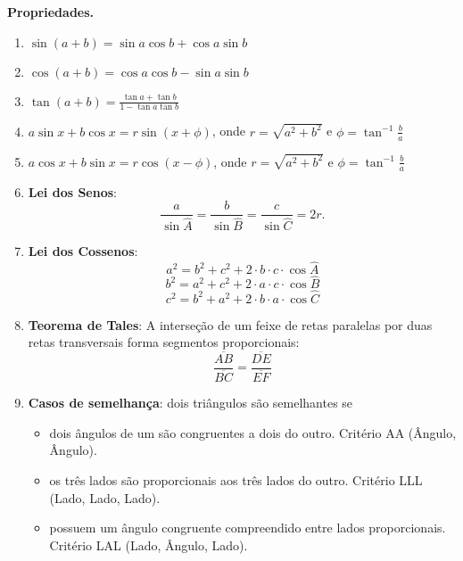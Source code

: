 \textbf{Propriedades.}
\begin{multicols}{2}
	\begin{enumerate}
		\item $\sin(a+b) = \sin a \cos b + \cos a \sin b$
		\item $\cos(a+b) = \cos a \cos b - \sin a \sin b$
		\item $\tan(a+b) = \frac{\tan a + \tan b}{1 - \tan a \tan b}$
		\item $a\sin x+b\cos x = r\sin(x+\phi)$, onde $r=\sqrt{a^2+b^2}$ e $\phi = \tan^{-1}\frac{b}{a}$ 
		\item $a\cos x+b\sin x = r\cos(x-\phi)$, onde $r=\sqrt{a^2+b^2}$ e $\phi = \tan^{-1}\frac{b}{a}$
		\item \textbf{Lei dos Senos}: $$\frac{a}{\sin \hat{A}} = \frac{b}{\sin \hat{B}} = \frac{c}{\sin \hat{C}} = 2r.$$
		\item \textbf{Lei dos Cossenos}:
		$$a^2 = b^2 +c^2+2\cdot b\cdot c\cdot\cos\hat{A}$$
		$$b^2 = a^2 +c^2+2\cdot a\cdot c\cdot\cos\hat{B}$$
		$$c^2 = b^2 +a^2+2\cdot b\cdot a\cdot\cos\hat{C}$$
		\item \textbf{Teorema de Tales}: A interseção de um feixe de retas paralelas por duas retas transversais forma segmentos proporcionais:
		$$\frac{\overline{AB}}{\overline{BC}} = \frac{\overline{DE}}{\overline{EF}}$$
		\item \textbf{Casos de semelhança}: dois triângulos são semelhantes se
		\begin{itemize}
			\item dois ângulos de um são congruentes a dois do outro. Critério AA (Ângulo, Ângulo).
			\item os três lados são proporcionais aos três lados do outro. Critério LLL (Lado, Lado, Lado).
			\item possuem um ângulo congruente compreendido entre lados proporcionais. Critério LAL (Lado, Ângulo, Lado).
		\end{itemize}

	\end{enumerate}
\end{multicols}
